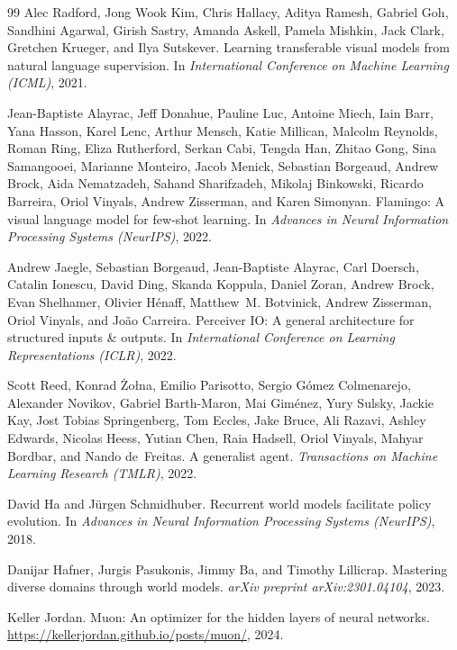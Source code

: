 \begin{thebibliography}{99}
Alec Radford, Jong Wook Kim, Chris Hallacy, Aditya Ramesh, Gabriel Goh, Sandhini Agarwal,
  Girish Sastry, Amanda Askell, Pamela Mishkin, Jack Clark, Gretchen Krueger, and Ilya Sutskever.
\newblock Learning transferable visual models from natural language supervision.
\newblock In \emph{International Conference on Machine Learning (ICML)}, 2021.

Jean-Baptiste Alayrac, Jeff Donahue, Pauline Luc, Antoine Miech, Iain Barr, Yana Hasson, Karel
  Lenc, Arthur Mensch, Katie Millican, Malcolm Reynolds, Roman Ring, Eliza Rutherford, Serkan
  Cabi, Tengda Han, Zhitao Gong, Sina Samangooei, Marianne Monteiro, Jacob Menick, Sebastian
  Borgeaud, Andrew Brock, Aida Nematzadeh, Sahand Sharifzadeh, Mikolaj Binkowski, Ricardo
  Barreira, Oriol Vinyals, Andrew Zisserman, and Karen Simonyan.
\newblock Flamingo: A visual language model for few-shot learning.
\newblock In \emph{Advances in Neural Information Processing Systems (NeurIPS)}, 2022.

Andrew Jaegle, Sebastian Borgeaud, Jean-Baptiste Alayrac, Carl Doersch, Catalin Ionescu, David
  Ding, Skanda Koppula, Daniel Zoran, Andrew Brock, Evan Shelhamer, Olivier H\'{e}naff, Matthew~M.
  Botvinick, Andrew Zisserman, Oriol Vinyals, and Jo\~{a}o Carreira.
\newblock Perceiver IO: A general architecture for structured inputs \& outputs.
\newblock In \emph{International Conference on Learning Representations (ICLR)}, 2022.

Scott Reed, Konrad \.{Z}o\l{}na, Emilio Parisotto, Sergio G\'{o}mez Colmenarejo, Alexander Novikov,
  Gabriel Barth-Maron, Mai Gim\'{e}nez, Yury Sulsky, Jackie Kay, Jost Tobias Springenberg, Tom
  Eccles, Jake Bruce, Ali Razavi, Ashley Edwards, Nicolas Heess, Yutian Chen, Raia Hadsell, Oriol
  Vinyals, Mahyar Bordbar, and Nando de~Freitas.
\newblock A generalist agent.
\newblock \emph{Transactions on Machine Learning Research (TMLR)}, 2022.

David Ha and J\"{u}rgen Schmidhuber.
\newblock Recurrent world models facilitate policy evolution.
\newblock In \emph{Advances in Neural Information Processing Systems (NeurIPS)}, 2018.

Danijar Hafner, Jurgis Pasukonis, Jimmy Ba, and Timothy Lillicrap.
\newblock Mastering diverse domains through world models.
\newblock \emph{arXiv preprint arXiv:2301.04104}, 2023.

Keller Jordan.
\newblock Muon: An optimizer for the hidden layers of neural networks.
\newblock \url{https://kellerjordan.github.io/posts/muon/}, 2024.


\end{thebibliography}
